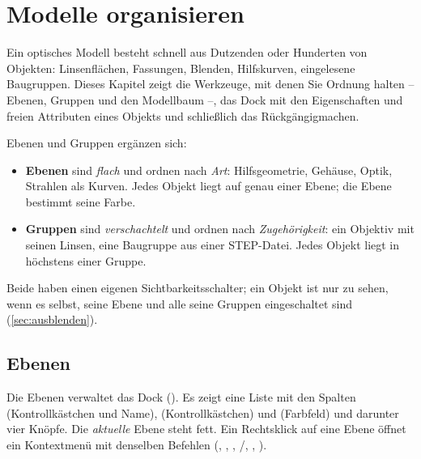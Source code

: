 \chapter{Modelle organisieren}\label{kap:organisieren}

Ein optisches Modell besteht schnell aus Dutzenden oder Hunderten von Objekten: Linsenflächen,
Fassungen, Blenden, Hilfskurven, eingelesene Baugruppen. Dieses Kapitel zeigt die Werkzeuge,
mit denen Sie Ordnung halten -- Ebenen, Gruppen und den Modellbaum --, das Dock
 mit den Eigenschaften und freien Attributen eines Objekts und schließlich das
Rückgängigmachen.

Ebenen und Gruppen ergänzen sich:

\begin{itemize}
  \item \textbf{Ebenen} sind \emph{flach} und ordnen nach \emph{Art}: Hilfsgeometrie,
    Gehäuse, Optik, Strahlen als Kurven. Jedes Objekt liegt auf genau einer Ebene; die Ebene
    bestimmt seine Farbe.
  \item \textbf{Gruppen} sind \emph{verschachtelt} und ordnen nach \emph{Zugehörigkeit}: ein
    Objektiv mit seinen Linsen, eine Baugruppe aus einer STEP-Datei. Jedes Objekt liegt in
    höchstens einer Gruppe.
\end{itemize}

Beide haben einen eigenen Sichtbarkeitsschalter; ein Objekt ist nur zu sehen, wenn es selbst,
seine Ebene und alle seine Gruppen eingeschaltet sind (\autoref{sec:ausblenden}).

\section{Ebenen}\label{sec:ebenen}

Die Ebenen verwaltet das Dock  (). Es zeigt eine Liste mit den
Spalten  (Kontrollkästchen und Name),  (Kontrollkästchen) und
 (Farbfeld) und darunter vier Knöpfe. Die \emph{aktuelle} Ebene steht fett. Ein
Rechtsklick auf eine Ebene öffnet ein Kontextmenü mit denselben Befehlen (,
, , /, ,
).

